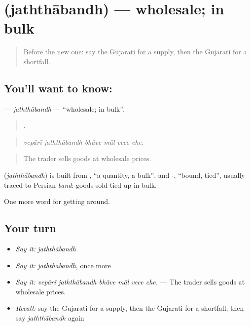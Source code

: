 \section[\texorpdfstring{\gu{જથ્થાબંધ} (jaththābandh)}{જથ્થાબંધ (jaththābandh)}]{ (jaththābandh) — wholesale; in bulk}

\label{lesson:GU-C431-jaththabandh}



\begin{quote}
Before the new one: say the Gujarati for a supply, then the Gujarati for a shortfall.
\end{quote}

\subsection*{You'll want to know: }
\textbf{} — \emph{jaththābandh} — \textquotedblleft{}wholesale; in bulk\textquotedblright{}.

\begin{quote}
     .
\end{quote}

\begin{quote}
\emph{vepārī jaththābandh bhāve māl vece che.}
\end{quote}

\begin{quote}
The trader sells goods at wholesale prices.
\end{quote}

\begin{cousinweb}
\textbf{} (\emph{jaththābandh}) is built from , \textquotedblleft{}a quantity, a bulk\textquotedblright{}, and -, \textquotedblleft{}bound, tied\textquotedblright{}, usually traced to Persian \emph{band}: goods sold tied up in bulk.
\end{cousinweb}

\begin{grammarlens}[title={What you've built}]
One more word for getting around.
\end{grammarlens}

\subsection*{Your turn}
\begin{itemize}
\raggedright
  \item \emph{Say it:} \emph{jaththābandh}
  \item \emph{Say it:} \emph{jaththābandh}, once more
  \item \emph{Say it:} \emph{vepārī jaththābandh bhāve māl vece che.} — The trader sells goods at wholesale prices.
  \item \emph{Recall:} say the Gujarati for a supply, then the Gujarati for a shortfall, then say \emph{jaththābandh} again
\end{itemize}

